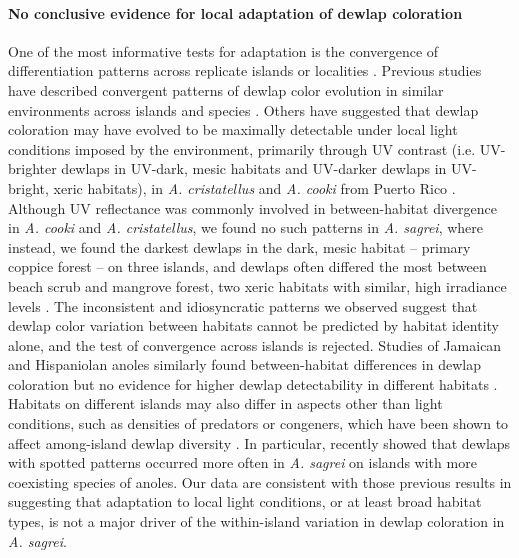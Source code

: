 \paragraph{No conclusive evidence for local adaptation of dewlap coloration} One of the most informative tests for adaptation is the convergence of differentiation patterns across replicate islands or localities \citep{Losos2009, Losos2011}. Previous studies have described convergent patterns of dewlap color evolution in similar environments across islands and species \citep{Thorpe2002a, Thorpe2002b}. Others have suggested that dewlap coloration may have evolved to be maximally detectable under local light conditions imposed by the environment, primarily through UV contrast (i.e. UV-brighter dewlaps in UV-dark, mesic habitats and UV-darker dewlaps in UV-bright, xeric habitats), in \textit{A. cristatellus} and \textit{A. cooki} from Puerto Rico \citep{Leal2002, Leal2004}. Although UV reflectance was commonly involved in between-habitat divergence in \textit{A. cooki} and \textit{A. cristatellus}, we found no such patterns in \textit{A. sagrei}, where instead, we found the darkest dewlaps in the dark, mesic habitat -- primary coppice forest -- on three islands, and dewlaps often differed the most between beach scrub and mangrove forest, two xeric habitats with similar, high irradiance levels \citep{Howard1950, Schoener1968}. The inconsistent and idiosyncratic patterns we observed suggest that dewlap color variation between habitats cannot be predicted by habitat identity alone, and the test of convergence across islands is rejected. Studies of Jamaican and Hispaniolan anoles similarly found between-habitat differences in dewlap coloration but no evidence for higher dewlap detectability in different habitats \citep{Fleishman2009, Ng2012}. Habitats on different islands may also differ in aspects other than light conditions, such as densities of predators or congeners, which have been shown to affect among-island dewlap diversity \citep{Vanhooydonck2009, Baeckens2018}. In particular, \citet{Baeckens2018} recently showed that dewlaps with spotted patterns occurred more often in \textit{A. sagrei} on islands with more coexisting species of anoles. Our data are consistent with those previous results in suggesting that adaptation to local light conditions, or at least broad habitat types, is not a major driver of the within-island variation in dewlap coloration in \textit{A. sagrei}.

